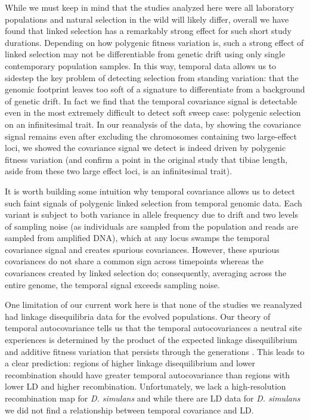 \documentclass[11pt]{article}
\begin{document}
While we must keep in mind that the studies analyzed here were all laboratory
populations and natural selection in the wild will likely differ, overall we
have found that linked selection has a remarkably strong effect for such short
study durations. Depending on how polygenic fitness variation is, such a strong
effect of linked selection may not be differentiable from genetic drift using
only single contemporary population samples. In this way, temporal data allows
us to sidestep the key problem of detecting selection from standing variation:
that the genomic footprint leaves too soft of a signature to differentiate from
a background of genetic drift. In fact we find that the temporal covariance
signal is detectable even in the most extremely difficult to detect soft sweep
case: polygenic selection on an infinitesimal trait. In our reanalysis of the
\textcite{Castro2019-uk} data, by showing the covariance signal remains even
after excluding the chromosomes containing two large-effect loci, we showed the
covariance signal we detect is indeed driven by polygenic fitness variation
(and confirm a point in the original study that tibiae length, aside from these
two large effect loci, is an infinitesimal trait). 

It is worth building some intuition why temporal covariance allows us to detect
such faint signals of polygenic linked selection from temporal genomic data.
Each variant is subject to both variance in allele frequency due to drift and
two levels of sampling noise (as individuals are sampled from the population
and reads are sampled from amplified DNA), which at any locus swamps the
temporal covariance signal and creates spurious covariances. However, these
spurious covariances do not share a common sign across timepoints whereas the
covariances created by linked selection do; consequently, averaging across the
entire genome, the temporal signal exceeds sampling noise.

One limitation of our current work here is that none of the studies we
reanalyzed had linkage disequilibria data for the evolved populations. Our
theory of temporal autocovariance tells us that the temporal autocovariances a
neutral site experiences is determined by the product of the expected linkage
disequilibrium and additive fitness variation that persists through the
generations \parencite{Buffalo2019-io}. This leads to a clear prediction:
regions of higher linkage disequilibrium and lower recombination should have
greater temporal autocovariance than regions with lower LD and higher
recombination. Unfortunately, we lack a high-resolution recombination map for
\emph{D. simulans} and while there are LD data for \emph{D. simulans}
\parencite{Signor2018-wg} we did not find a relationship between temporal
covariance and LD. 
\end{document}
